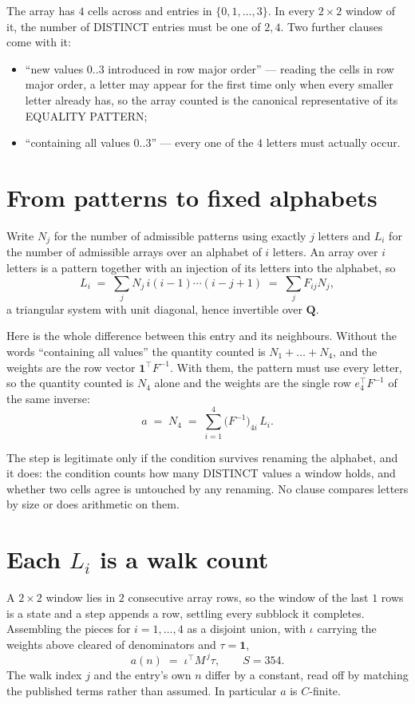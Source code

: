 \documentclass[11pt,a4paper]{article}
\theoremstyle{plain}
\theoremstyle{definition}
\begin{document}
The array has $4$ cells across and entries in $\{0,1,\dots,3\}$. In every
$2\times2$ window of it, the number of DISTINCT entries must be one of $2, 4$. Two
further clauses come with it:

\begin{itemize}
\item ``new values $0..3$ introduced in row major order'' --- reading the cells in row major
order, a letter may appear for the first time only when every smaller letter already has, so
the array counted is the canonical representative of its EQUALITY PATTERN;
\item ``containing all values $0..3$'' --- every one of the $4$ letters must actually
occur.
\end{itemize}


\section{From patterns to fixed alphabets}

Write $N_j$ for the number of admissible patterns using exactly $j$ letters and $L_i$ for the
number of admissible arrays over an alphabet of $i$ letters. An array over $i$ letters is a
pattern together with an injection of its letters into the alphabet, so
\[
L_i\;=\;\sum_{j} N_j\,i(i-1)\cdots(i-j+1)\;=\;\sum_j F_{ij}N_j ,
\]
a triangular system with unit diagonal, hence invertible over $\mathbf{Q}$.

Here is the whole difference between this entry and its neighbours. Without the words
``containing all values'' the quantity counted is $N_1+\dots+N_{4}$, and the weights are
the row vector $\mathbf{1}^{\!\top}F^{-1}$. With them, the pattern must use every letter,
so the quantity counted is $N_{4}$ alone and the weights are the single row
$e_{4}^{\!\top}F^{-1}$ of the same inverse:
\[
a\;=\;N_{4}\;=\;\sum_{i=1}^{4}\bigl(F^{-1}\bigr)_{4i}\,L_i .
\]

The step is legitimate only if the condition survives renaming the alphabet, and it does: the
condition counts how many DISTINCT values a window holds, and whether two cells agree is
untouched by any renaming. No clause compares letters by size or does arithmetic on them.

\section{Each $L_i$ is a walk count}

A $2\times2$ window lies in $2$ consecutive array rows, so the window of the last
$1$ rows is a state and a step appends a row, settling every subblock it completes.
Assembling the pieces for $i=1,\dots,4$ as a disjoint union, with $\iota$ carrying the
weights above cleared of denominators and $\tau=\mathbf{1}$,
\[
a(n)\;=\;\iota^{\!\top}M^{\,j}\tau ,\qquad S=354.
\]
The walk index $j$ and the entry's own $n$ differ by a constant, read off by matching the
published terms rather than assumed. In particular $a$ is $C$-finite.
\end{document}
